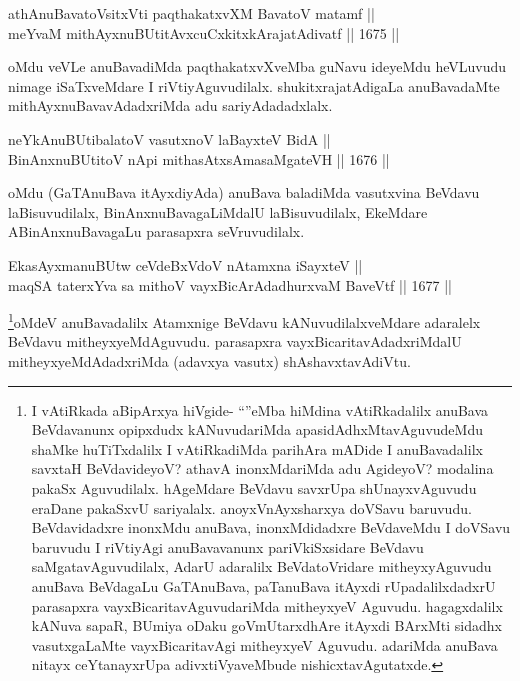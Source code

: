
\begin{shl}
athAnuBavatoV\s sitxVti paqthakatxvXM BavatoV matamf || \\
meYvaM mithAyxnuBUtitAvxcuCxkitxkArajatAdivatf \hfill || 1675 ||  
\end{shl}

\begin{artha}
oMdu veVLe anuBavadiMda paqthakatxvXveMba guNavu ideyeMdu heVLuvudu nimage iSaTxveMdare I riVtiyAguvudilalx. shukitxrajatAdigaLa anuBavadaMte mithAyxnuBavavAdadxriMda adu sariyAdadadxlalx.
\end{artha}

\begin{shl}
neYkAnuBUtibalatoV vasutxnoV laBayxteV BidA || \\
BinAnxnuBUtitoV nApi mithasAtxsAmasaMgateVH \hfill || 1676 ||  
\end{shl}

\begin{artha}
oMdu (GaTAnuBava itAyxdiyAda) anuBava baladiMda vasutxvina BeVdavu laBisuvudilalx, BinAnxnuBavagaLiMdalU laBisuvudilalx, EkeMdare ABinAnxnuBavagaLu parasapxra seVruvudilalx.
\end{artha}

\begin{shl}
EkasAyxmanuBUtw ceVdeBxVdoV nA\s \s tamxna iSayxteV || \\
maqSA taterxYva sa mithoV vayxBicArAdadhurxvaM BaveVtf \hfill || 1677 ||  
\end{shl}

\begin{artha}
\footnote{I vAtiRkada aBipArxya hiVgide- ``\stext''eMba hiMdina vAtiRkadalilx anuBava BeVdavanunx opipxdudx kANuvudariMda apasidAdhxMtavAguvudeMdu shaMke huTiTxdalilx I vAtiRkadiMda parihAra mADide I anuBavadalilx savxtaH BeVdavideyoV? athavA inonxMdariMda adu AgideyoV? modalina pakaSx Aguvudilalx. hAgeMdare BeVdavu savxrUpa shUnayxvAguvudu eraDane pakaSxvU sariyalalx. anoyxVnAyxsharxya doVSavu baruvudu. BeVdavidadxre inonxMdu anuBava, inonxMdidadxre BeVdaveMdu I doVSavu baruvudu I riVtiyAgi anuBavavanunx pariVkiSxsidare BeVdavu saMgatavAguvudilalx, AdarU adaralilx BeVdatoVridare mitheyxyAguvudu anuBava BeVdagaLu GaTAnuBava, paTanuBava itAyxdi rUpadalilxdadxrU parasapxra vayxBicaritavAguvudariMda mitheyxyeV Aguvudu. hagagxdalilx kANuva sapaR, BUmiya oDaku goVmUtarxdhAre itAyxdi BArxMti sidadhx vasutxgaLaMte vayxBicaritavAgi mitheyxyeV Aguvudu. adariMda anuBava nitayx ceYtanayxrUpa adivxtiVyaveMbude nishicxtavAgutatxde.}oMdeV anuBavadalilx Atamxnige BeVdavu kANuvudilalxveMdare adaralelx BeVdavu mitheyxyeMdAguvudu. parasapxra vayxBicaritavAdadxriMdalU mitheyxyeMdAdadxriMda (adavxya vasutx) shAshavxtavAdiVtu.
\end{artha}


